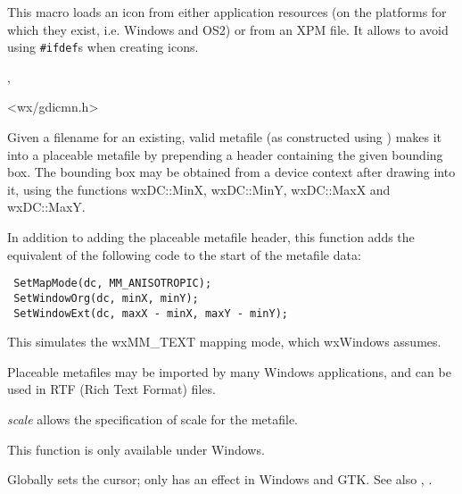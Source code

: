 
This macro loads an icon from either application resources (on the platforms
for which they exist, i.e. Windows and OS2) or from an XPM file. It allows to
avoid using {\tt \#ifdef}s when creating icons.


,


<wx/gdicmn.h>

\label{wxmakemetafileplaceable}


Given a filename for an existing, valid metafile (as constructed using )
makes it into a placeable metafile by prepending a header containing the given
bounding box. The bounding box may be obtained from a device context after drawing
into it, using the functions wxDC::MinX, wxDC::MinY, wxDC::MaxX and wxDC::MaxY.

In addition to adding the placeable metafile header, this function adds
the equivalent of the following code to the start of the metafile data:

\begin{verbatim}
 SetMapMode(dc, MM_ANISOTROPIC);
 SetWindowOrg(dc, minX, minY);
 SetWindowExt(dc, maxX - minX, maxY - minY);
\end{verbatim}

This simulates the wxMM\_TEXT mapping mode, which wxWindows assumes.

Placeable metafiles may be imported by many Windows applications, and can be
used in RTF (Rich Text Format) files.

{\it scale} allows the specification of scale for the metafile.

This function is only available under Windows.

\label{wxsetcursor}


Globally sets the cursor; only has an effect in Windows and GTK.
See also , .

